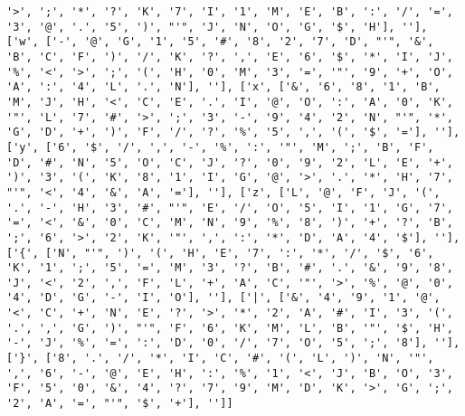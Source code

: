 \documentclass{article}
\begin{document}
\begin{verbatim}
'>', ';', '*', '?', 'K', '7', 'I', '1', 'M', 'E', 'B', ':', '/', '=', '3', '@', '.', '5', ')', "'", 'J', 'N', 'O', 'G', '$', 'H'], ''], ['w', ['-', '@', 'G', '1', '5', '#', '8', '2', '7', 'D', "'", '&', 'B', 'C', 'F', ')', '/', 'K', '?', ',', 'E', '6', '$', '*', 'I', 'J', '%', '<', '>', ';', '(', 'H', '0', 'M', '3', '=', '"', '9', '+', 'O', 'A', ':', '4', 'L', '.', 'N'], ''], ['x', ['&', '6', '8', '1', 'B', 'M', 'J', 'H', '<', 'C', 'E', '.', 'I', '@', 'O', ':', 'A', '0', 'K', '"', 'L', '7', '#', '>', ';', '3', '-', '9', '4', '2', 'N', "'", '*', 'G', 'D', '+', ')', 'F', '/', '?', '%', '5', ',', '(', '$', '='], ''], ['y', ['6', '$', '/', ',', '-', '%', ':', '"', 'M', ';', 'B', 'F', 'D', '#', 'N', '5', 'O', 'C', 'J', '?', '0', '9', '2', 'L', 'E', '+', ')', '3', '(', 'K', '8', '1', 'I', 'G', '@', '>', '.', '*', 'H', '7', "'", '<', '4', '&', 'A', '='], ''], ['z', ['L', '@', 'F', 'J', '(', '.', '-', 'H', '3', '#', "'", 'E', '/', 'O', '5', 'I', '1', 'G', '7', '=', '<', '&', '0', 'C', 'M', 'N', '9', '%', '8', ')', '+', '?', 'B', ';', '6', '>', '2', 'K', '"', ',', ':', '*', 'D', 'A', '4', '$'], ''], ['{', ['N', "'", ')', '(', 'H', 'E', '7', ':', '*', '/', '$', '6', 'K', '1', ';', '5', '=', 'M', '3', '?', 'B', '#', '.', '&', '9', '8', 'J', '<', '2', ',', 'F', 'L', '+', 'A', 'C', '"', '>', '%', '@', '0', '4', 'D', 'G', '-', 'I', 'O'], ''], ['|', ['&', '4', '9', '1', '@', '<', 'C', '+', 'N', 'E', '?', '>', '*', '2', 'A', '#', 'I', '3', '(', '.', ',', 'G', ')', "'", 'F', '6', 'K', 'M', 'L', 'B', '"', '$', 'H', '-', 'J', '%', '=', ':', 'D', '0', '/', '7', 'O', '5', ';', '8'], ''], ['}', ['8', '.', '/', '*', 'I', 'C', '#', '(', 'L', ')', 'N', '"', ',', '6', '-', '@', 'E', 'H', ':', '%', '1', '<', 'J', 'B', 'O', '3', 'F', '5', '0', '&', '4', '?', '7', '9', 'M', 'D', 'K', '>', 'G', ';', '2', 'A', '=', "'", '$', '+'], '']]


\end{verbatim}
\end{document}

